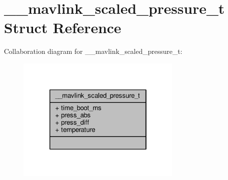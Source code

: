 \hypertarget{struct____mavlink__scaled__pressure__t}{\section{\+\_\+\+\_\+mavlink\+\_\+scaled\+\_\+pressure\+\_\+t Struct Reference}
\label{struct____mavlink__scaled__pressure__t}
}


Collaboration diagram for \+\_\+\+\_\+mavlink\+\_\+scaled\+\_\+pressure\+\_\+t\+:
\nopagebreak
\begin{figure}[H]
\begin{center}
\leavevmode
\includegraphics[width=226pt]{struct____mavlink__scaled__pressure__t__coll__graph}
\end{center}
\end{figure}
